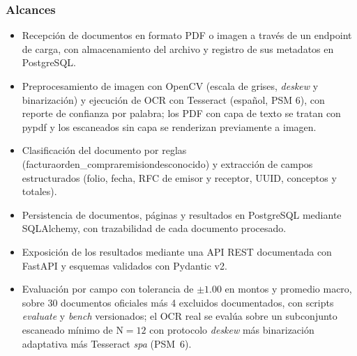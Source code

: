 \subsubsection{Alcances} \label{subsec:alcances}
\begin{itemize}
    \item Recepción de documentos en formato PDF o imagen a través de un endpoint de carga, con almacenamiento del archivo y registro de sus metadatos en PostgreSQL.
    \item Preprocesamiento de imagen con OpenCV (escala de grises, \textit{deskew} y binarización) y ejecución de OCR con Tesseract (español, PSM 6), con reporte de confianza por palabra; los PDF con capa de texto se tratan con pypdf y los escaneados sin capa se renderizan previamente a imagen.
    \item Clasificación del documento por reglas (factura\textbar orden\_compra\textbar remision\textbar desconocido) y extracción de campos estructurados (folio, fecha, RFC de emisor y receptor, UUID, conceptos y totales).
    \item Persistencia de documentos, páginas y resultados en PostgreSQL mediante SQLAlchemy, con trazabilidad de cada documento procesado.
    \item Exposición de los resultados mediante una API REST documentada con FastAPI y esquemas validados con Pydantic v2.
    \item Evaluación por campo con tolerancia de $\pm 1.00$ en montos y promedio macro, sobre 30 documentos oficiales más 4 excluidos documentados, con scripts \textit{evaluate} y \textit{bench} versionados; el OCR real se evalúa sobre un subconjunto escaneado mínimo de N${=}12$ con protocolo \textit{deskew} más binarización adaptativa más Tesseract \textit{spa} (PSM~6).
\end{itemize}

